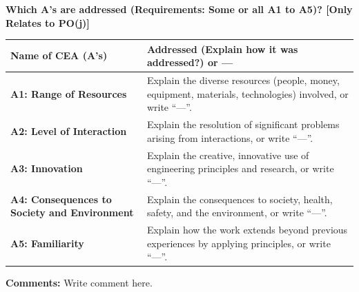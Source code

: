 \begin{onehalfspace}
\clearpage

\noindent
\textbf{Which A's are addressed (Requirements: Some or all A1 to A5)? [Only Relates to PO(j)]}\par\vspace{4pt}
\begin{xltabular}{\textwidth}{|>{\raggedright\arraybackslash}p{6.2cm}|>{\raggedright\arraybackslash}X|}
  \hline
  \textbf{Name of CEA (A's)} & \textbf{Addressed (Explain how it was addressed?) or ---} \\
  \hline
  \endhead
  \textbf{A1: Range of Resources} & Explain the diverse resources (people, money, equipment, materials, technologies) involved, or write ``---''. \\ \hline
  \textbf{A2: Level of Interaction} & Explain the resolution of significant problems arising from interactions, or write ``---''. \\ \hline
  \textbf{A3: Innovation} & Explain the creative, innovative use of engineering principles and research, or write ``---''. \\ \hline
  \textbf{A4: Consequences to Society and Environment} & Explain the consequences to society, health, safety, and the environment, or write ``---''. \\ \hline
  \textbf{A5: Familiarity} & Explain how the work extends beyond previous experiences by applying principles, or write ``---''. \\ \hline
\end{xltabular}

\vspace{14pt}
\noindent
\textbf{Comments:} Write comment here.

\end{onehalfspace}
